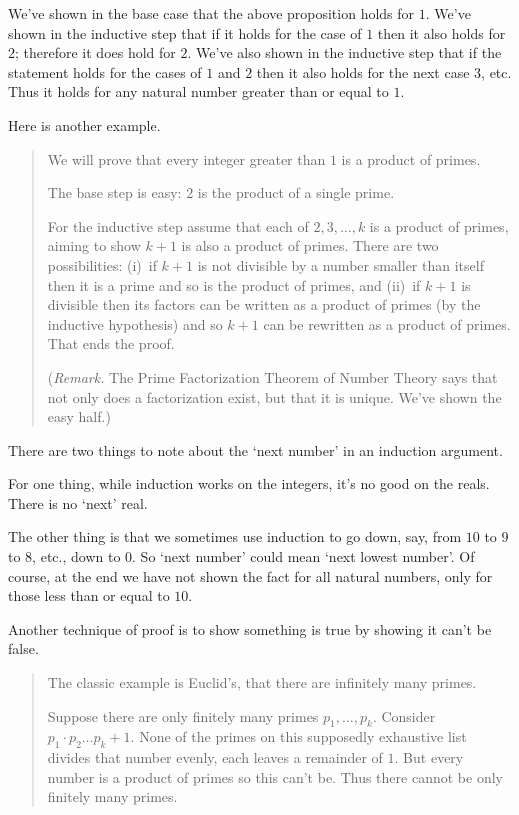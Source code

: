 We've shown in the base case that the above proposition holds for \( 1 \).
We've shown in the inductive step 
that if it holds for the case of \( 1 \) then it also holds for \( 2 \);
therefore it does hold for $2$.
We've also shown in the inductive step that 
if the statement holds for the cases of \( 1 \) and \( 2 \) 
then it also holds for the next case \( 3 \), etc.
Thus it holds for any natural number greater than or equal to \( 1 \).

Here is another example.

\begin{quote}\small
We will prove that every integer greater than \( 1 \) is a product
of primes.

The base step is easy: \( 2 \) is the product of a single prime.

For the inductive step assume that each of \( 2, 3,\ldots ,k \) is a
product of primes, aiming to show \( k+1 \) is also a product of
primes.
There are two possibilities:
(i)~if \( k+1 \) is not divisible by a number smaller than itself then it
is a prime and so is the product of primes, 
and (ii)~if \( k+1 \) is divisible then its
factors can be written as a product of primes (by the inductive hypothesis)
and so \( k+1 \) can be rewritten as a product of primes.
That ends the proof.

(\textit{Remark.}
The Prime Factorization Theorem of Number Theory says that
not only does a factorization exist, but that it is unique.
We've shown the easy half.)
\end{quote}

There are two things to note about the `next number' in an induction
argument.

For one thing, while induction works on the integers, it's no good on the
reals.
There is no `next' real.

The other thing is that we sometimes use induction to go down, say, from
\( 10 \) to \( 9 \) to \( 8 \), etc., down to \( 0 \).
So `next number' could mean `next lowest number'.
Of course, at the end we have not shown the fact for all natural numbers, only
for those less than or equal to \( 10 \).




Another technique of proof is
to show something is true by showing it can't be false.


\begin{quote}\small
The classic example is Euclid's, that there are
infinitely many primes.

Suppose there are only finitely many primes \( p_1,\dots,p_k \).
Consider \( p_1\cdot p_2\dots p_k +1 \).
None of the primes on this supposedly exhaustive list divides that number
evenly, each leaves a remainder of \( 1 \).
But every number is a product of primes so this can't be.
Thus there cannot be only finitely many primes.
\end{quote}

